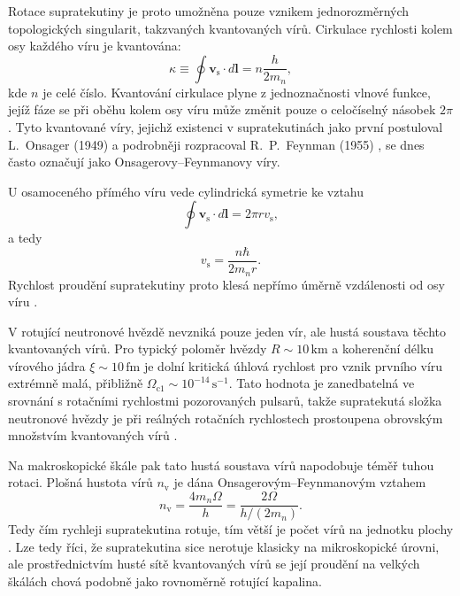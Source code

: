 \documentclass[%
final%
,htext%
]{ipothes}
\begin{document}
Rotace supratekutiny je proto umožněna pouze vznikem jednorozměrných topologických singularit, takzvaných kvantovaných vírů. Cirkulace rychlosti kolem osy každého víru je kvantována:
\begin{equation}
    \kappa
    \equiv
    \oint \mathbf{v}_{\mathrm{s}}\cdot d\mathbf{l}
    =
    n\frac{h}{2m_n},
    \label{eq:circulation_quantization}
\end{equation}
kde $n$ je celé číslo. Kvantování cirkulace plyne z jednoznačnosti vlnové funkce, jejíž fáze se při oběhu kolem osy víru může změnit pouze o celočíselný násobek $2\pi$. Tyto kvantované víry, jejichž existenci v supratekutinách jako první postuloval L.~Onsager (1949) \cite{onsager1949} a podrobněji rozpracoval R.~P.~Feynman (1955) \cite{feynman1955}, se dnes často označují jako Onsagerovy--Feynmanovy víry.

U osamoceného přímého víru vede cylindrická symetrie ke vztahu
\begin{equation}
    \oint \mathbf{v}_{\mathrm{s}}\cdot d\mathbf{l}
    =
    2\pi r v_{\mathrm{s}},
    \label{eq:cylindrical_circulation}
\end{equation}
a tedy
\begin{equation}
    v_{\mathrm{s}}
    =
    \frac{n\hbar}{2m_n r}.
    \label{eq:vortex_velocity}
\end{equation}
Rychlost proudění supratekutiny proto klesá nepřímo úměrně vzdálenosti od osy víru \cite{ghosh2007}.

V rotující neutronové hvězdě nevzniká pouze jeden vír, ale hustá soustava těchto kvantovaných vírů. Pro typický poloměr hvězdy $R\sim 10\,\mathrm{km}$ a koherenční délku vírového jádra $\xi\sim 10\,\mathrm{fm}$ je dolní kritická úhlová rychlost pro vznik prvního víru extrémně malá, přibližně $\Omega_{\mathrm{c1}}\sim 10^{-14}\,\mathrm{s^{-1}}$. Tato hodnota je zanedbatelná ve srovnání s rotačními rychlostmi pozorovaných pulsarů, takže supratekutá složka neutronové hvězdy je při reálných rotačních rychlostech prostoupena obrovským množstvím kvantovaných vírů \cite{ghosh2007}.

Na makroskopické škále pak tato hustá soustava vírů napodobuje téměř tuhou rotaci. Plošná hustota vírů $n_{\mathrm{v}}$ je dána Onsagerovým--Feynmanovým vztahem
\begin{equation}
    n_{\mathrm{v}}
    =
    \frac{4m_n\Omega}{h}
    =
    \frac{2\Omega}{h/(2m_n)}.
    \label{eq:onsager_feynman_density}
\end{equation}
Tedy čím rychleji supratekutina rotuje, tím větší je počet vírů na jednotku plochy \cite{feynman1955}. Lze tedy říci, že supratekutina sice nerotuje klasicky na mikroskopické úrovni, ale prostřednictvím husté sítě kvantovaných vírů se její proudění na velkých škálách chová podobně jako rovnoměrně rotující kapalina.
\end{document}

